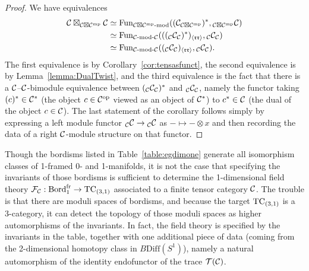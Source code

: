 \documentclass{amsart}
\begin{document}
\begin{proof}
We have equivalences
\begin{align*}
\cC \boxtimes_{\cC \boxtimes \cC^\mp} \cC
&\simeq
\Fun_{\mod{\cC \boxtimes \cC^\mp}{}}((\cC_{\cC \boxtimes \cC^\mp})^*,{}_{\cC \boxtimes \cC^\mp} \cC) \\
&\simeq
\Fun_{\mod{\cC}{\cC}}((({}_\cC \cC_\cC)^*)_{\langle \mathfrak{r r} \rangle},{}_\cC \cC_\cC) \\
&\simeq
\Fun_{\mod{\cC}{\cC}}(({}_\cC \cC_\cC)_{\langle \mathfrak{r r} \rangle},{}_\cC \cC_\cC).
\end{align*}
The first equivalence is by Corollary~\ref{cor:tensasfunct}, the second equivalence is by Lemma~\ref{lemma:DualTwist}, and the third equivalence is the fact that there is a $\mathcal C$--$\mathcal C$-bimodule equivalence between $({}_\mathcal C \mathcal C_\mathcal C)^*$ and ${}_\mathcal C \mathcal C_\mathcal C$, namely the functor taking $(c)^* \in \mathcal C^*$ (the object $c \in \mathcal C^{\mathrm{op}}$ viewed as an object of $\mathcal C^*$) to $c^* \in \mathcal C$ (the dual of the object $c \in \mathcal C$).  The last statement of the corollary follows simply by expressing a left module functor ${}_\mathcal C \mathcal C \rightarrow {}_\mathcal C \mathcal C$ as $- \mapsto - \otimes x$ and then recording the data of a right $\mathcal C$-module structure on that functor.
\end{proof}

\begin{remark}
Though the bordisms listed in Table~\ref{table:egdimone} generate all isomorphism classes of 1-framed 0- and 1-manifolds, it is not the case that specifying the invariants of those bordisms is sufficient to determine the 1-dimensional field theory $\mathcal F_\mathcal C : \mathrm{Bord}^\mathrm{fr}_1 \rightarrow \mathrm{TC}_{(3,1)}$ associated to a finite tensor category $\mathcal C$.  The trouble is that there are moduli spaces of bordisms, and because the target $\mathrm{TC}_{(3,1)}$ is a 3-category, it can detect the topology of those moduli spaces as higher automorphisms of the invariants.  In fact, the field theory is specified by the invariants in the table, together with one additional piece of data (coming from the 2-dimensional homotopy class in $B\mathrm{Diff}(S^1)$), namely a natural automorphism of the identity endofunctor of the trace $\mathcal T(\mathcal C)$.
\end{remark}
\end{document}
